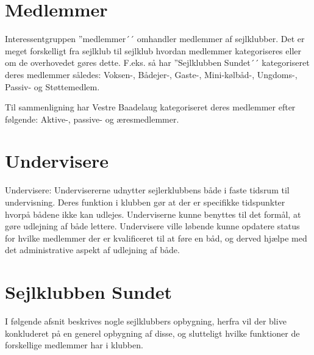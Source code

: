 \section{Medlemmer}

Interessentgruppen ''medlemmer´´ omhandler medlemmer af sejlklubber. Det er meget forskelligt fra sejlklub til
sejlklub hvordan medlemmer kategoriseres eller om de overhovedet gøres dette. F.eks. så har ''Sejlklubben
Sundet´´ kategoriseret deres medlemmer således: Voksen-, Bådejer-, Gaste-, Mini-kølbåd-, Ungdoms-, Passiv- og
Støttemedlem.

Til sammenligning har Vestre Baadelaug kategoriseret deres medlemmer efter følgende: Aktive-, passive- og
æresmedlemmer.




\section{Undervisere}

Undervisere: Undervisererne udnytter sejlerklubbens både i faste tidsrum til undervisning. Deres funktion i
klubben gør at der er specifikke tidspunkter hvorpå bådene ikke kan udlejes. Underviserne kunne benyttes til
det formål, at gøre udlejning af både lettere. Undervisere ville løbende kunne opdatere status for hvilke
medlemmer der er kvalificeret til at føre en båd, og derved hjælpe med det administrative aspekt af udlejning
af både.

\cbstart
\section{Sejlklubben Sundet}

I følgende afsnit beskrives nogle sejlklubbers opbygning, herfra vil der blive konkluderet på en generel opbygning af
disse, og slutteligt hvilke funktioner de forskellige medlemmer har i klubben.

